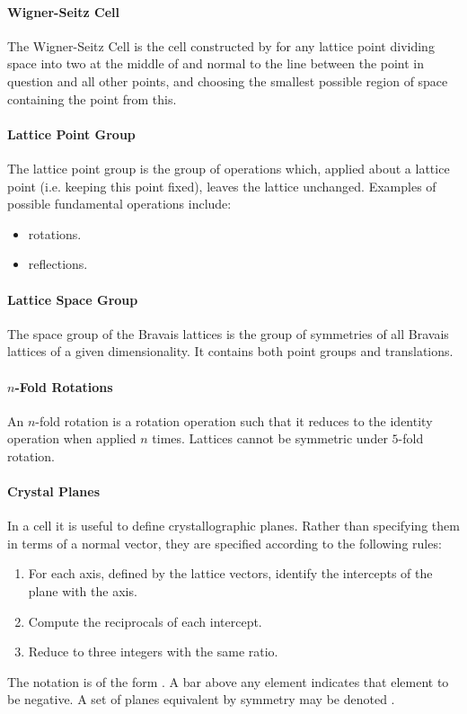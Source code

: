 \paragraph{Wigner-Seitz Cell}
The Wigner-Seitz Cell is the cell constructed by for any lattice point dividing space into two at the middle of and normal to the line between the point in question and all other points, and choosing the smallest possible region of space containing the point from this.

\paragraph{Lattice Point Group}
The lattice point group is the group of operations which, applied about a lattice point (i.e. keeping this point fixed), leaves the lattice unchanged. Examples of possible fundamental operations include:
\begin{itemize}
	\item rotations.
	\item reflections.
\end{itemize}

\paragraph{Lattice Space Group}
The space group of the Bravais lattices is the group of symmetries of all Bravais lattices of a given dimensionality. It contains both point groups and translations.

\paragraph{$n$-Fold Rotations}
An $n$-fold rotation is a rotation operation such that it reduces to the identity operation when applied $n$ times. Lattices cannot be symmetric under $5$-fold rotation.

\paragraph{Crystal Planes}
In a cell it is useful to define crystallographic planes. Rather than specifying them in terms of a normal vector, they are specified according to the following rules:
\begin{enumerate}
	\item For each axis, defined by the lattice vectors, identify the intercepts of the plane with the axis.
	\item Compute the reciprocals of each intercept.
	\item Reduce to three integers with the same ratio.
\end{enumerate}
The notation is of the form . A bar above any element indicates that element to be negative. A set of planes equivalent by symmetry may be denoted .

